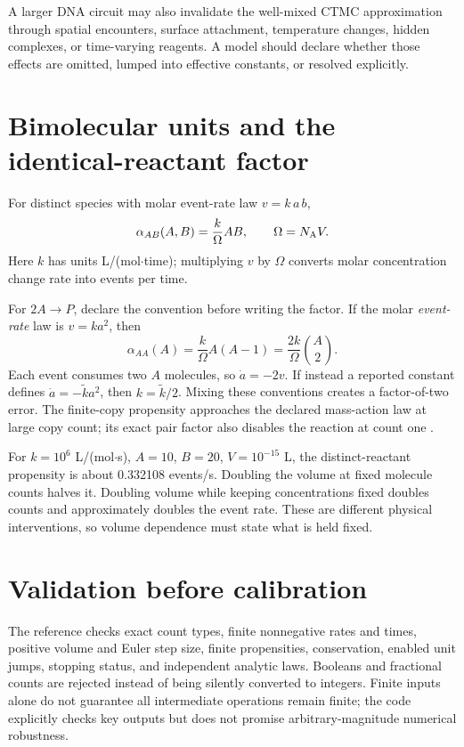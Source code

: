A larger DNA circuit may also invalidate the well-mixed CTMC approximation through
spatial encounters, surface attachment, temperature changes, hidden complexes,
or time-varying reagents. A model should declare whether those effects are omitted,
lumped into effective constants, or resolved explicitly.

\section{Bimolecular units and the identical-reactant factor}
For distinct species with molar event-rate law $v=k\,a\,b$,
\[
\alpha_{AB}(A,B)=\frac{k}{\Omega}AB,\qquad
\Omega=N_{\rm A}V.
\]
Here $k$ has units L/(mol$\cdot$time); multiplying $v$ by $\Omega$ converts
molar concentration change rate into events per time.

For $2A\to P$, declare the convention before writing the factor.
If the molar \emph{event-rate} law is $v=k a^2$, then
\[
\alpha_{AA}(A)=\frac{k}{\Omega}A(A-1)
=\frac{2k}{\Omega}\binom A2.
\]
Each event consumes two $A$ molecules, so $\dot a=-2v$.
If instead a reported constant defines $\dot a=-\widetilde k a^2$, then
$k=\widetilde k/2$. Mixing these conventions creates a factor-of-two error.
The finite-copy propensity approaches the declared mass-action law at large
copy count; its exact pair factor also disables the reaction at count one
\cite{Higham2008}.

For $k=10^6$ L/(mol$\cdot$s), $A=10$, $B=20$, $V=10^{-15}$ L,
the distinct-reactant propensity is about 0.332108 events/s. Doubling the volume
at fixed molecule counts halves it. Doubling volume while keeping concentrations
fixed doubles counts and approximately doubles the event rate. These are
different physical interventions, so volume dependence must state what is held fixed.

\section{Validation before calibration}
The reference checks exact count types, finite nonnegative rates and times,
positive volume and Euler step size, finite propensities, conservation, enabled
unit jumps, stopping status, and independent analytic laws. Booleans and fractional
counts are rejected instead of being silently converted to integers.
Finite inputs alone do not guarantee all intermediate operations remain finite;
the code explicitly checks key outputs but does not promise arbitrary-magnitude
numerical robustness.

